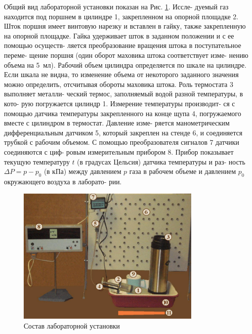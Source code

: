\documentclass[12pt]{article}
\begin{document}
Общий вид лабораторной установки показан на Рис. \ref{fig:setup}. Иссле-
дуемый газ находится под поршнем в цилиндре 1, закрепленном
на опорной площадке 2. Шток поршня имеет винтовую нарезку и
вставлен в гайку, также закрепленную на опорной площадке. Гайка
удерживает шток в заданном положении и с ее помощью осуществ-
ляется преобразование вращения штока в поступательное переме-
щение поршня (один оборот маховика штока соответствует изме-
нению объема на \SI{5}{мл}). Рабочий объем цилиндра определяется по %
шкале на цилиндре. Если шкала не видна, то изменение объема
от некоторого заданного значения можно определить, отсчитывая
обороты маховика штока. Роль термостата 3 выполняет металли-
ческий термос, заполняемый водой разной температуры, в кото-
рую погружается цилиндр 1. Измерение температуры производит-
ся с помощью датчика температуры закрепленного на конце щупа
4, погружаемого вместе с цилиндром в термостат. Давление изме-
ряется манометрическим дифференциальным датчиком 5, который
закреплен на стенде 6, и соединяется трубкой с рабочим объемом. С
помощью преобразователя сигналов 7 датчики соединяются с циф-
ровым измерительным прибором 8. Прибор показывает текущую
температуру $t$ (в градусах Цельсия) датчика температуры и раз-
ность $\Delta P = p - p_{0}$ (в \si{кПа}) между давлением $p$ газа в %
рабочем объеме и давлением $p_{0}$ окружающего воздуха в лаборато-
рии.

\vfill

\newpage
\vspace{1em} %

\begin{figure}[H] %
    \centering
    \includegraphics[width=0.8\textwidth]{fig_3.png} %
    \caption{Состав лабораторной установки}
    \label{fig:setup}
\end{figure}
\end{document}
